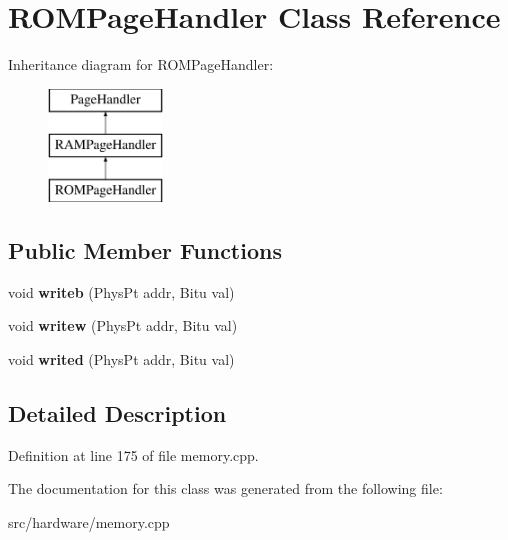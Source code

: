 \hypertarget{classROMPageHandler}{\section{R\-O\-M\-Page\-Handler Class Reference}
\label{classROMPageHandler}
}
Inheritance diagram for R\-O\-M\-Page\-Handler\-:\begin{figure}[H]
\begin{center}
\leavevmode
\includegraphics[height=3.000000cm]{classROMPageHandler}
\end{center}
\end{figure}
\subsection*{Public Member Functions}
\begin{DoxyCompactItemize}
\item 
\hypertarget{classROMPageHandler_aa90d31661b26c6a867783e3b8d299a43}{void {\bfseries writeb} (Phys\-Pt addr, Bitu val)}\label{classROMPageHandler_aa90d31661b26c6a867783e3b8d299a43}

\item 
\hypertarget{classROMPageHandler_a244bd425de97ffb60a1dbe3dfc513190}{void {\bfseries writew} (Phys\-Pt addr, Bitu val)}\label{classROMPageHandler_a244bd425de97ffb60a1dbe3dfc513190}

\item 
\hypertarget{classROMPageHandler_a47071afe3d028a424094077efe3356e5}{void {\bfseries writed} (Phys\-Pt addr, Bitu val)}\label{classROMPageHandler_a47071afe3d028a424094077efe3356e5}

\end{DoxyCompactItemize}


\subsection{Detailed Description}


Definition at line 175 of file memory.\-cpp.



The documentation for this class was generated from the following file\-:\begin{DoxyCompactItemize}
\item 
src/hardware/memory.\-cpp\end{DoxyCompactItemize}
